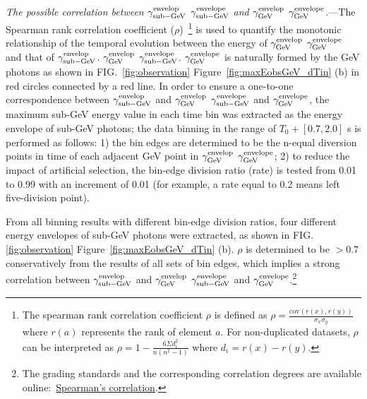 \documentclass[linenumbers,twocolumn]{aastex631}
\providecommand{\DIFaddtex}[1]{{\protect\color{blue} \sf #1}} %
\providecommand{\DIFdeltex}[1]{{\protect\color{red} \scriptsize #1}} %
\providecommand{\DIFaddbegin}{} %
\providecommand{\DIFaddend}{} %
\providecommand{\DIFdelbegin}{} %
\providecommand{\DIFdelend}{} %
\providecommand{\DIFadd}[1]{\texorpdfstring{\DIFaddtex{#1}}{#1}} %
\providecommand{\DIFdel}[1]{\texorpdfstring{\DIFdeltex{#1}}{}} %
\begin{document}
\textit{The possible correlation between  \DIFdelbegin \DIFdel{$\gamma^{\rm envelop}_{\rm sub-GeV}$ }\DIFdelend \DIFaddbegin \DIFadd{$\gamma^{\rm envelope}_{\rm sub-GeV}$ }\DIFaddend and \DIFdelbegin \DIFdel{$\gamma^{\rm envelop}_{\rm GeV}$}\DIFdelend \DIFaddbegin \DIFadd{$\gamma^{\rm envelope}_{\rm GeV}$}\DIFaddend .}\label{sec: correlation}---The Spearman rank correlation coefficient ($\rho$)~\citep{spearman}\footnote{The spearman rank correlation coefficient $\rho$ is defined as $\rho = \frac{\mathrm{cov}(r(x),r(y))}{\sigma_x \sigma_y} $ where $r(a)$ represents the rank of element $a$. For non-duplicated datasets, $\rho$ can be interpreted as $\rho = 1 - \frac{6 \Sigma d^2_i}{n(n^2-1)} $ where $d_i = r(x) - r(y)$.} is used to quantify the monotonic relationship of the temporal evolution between the energy of \DIFdelbegin \DIFdel{$\gamma^{\rm envelop}_{\rm GeV}$ }\DIFdelend \DIFaddbegin \DIFadd{$\gamma^{\rm envelope}_{\rm GeV}$ }\DIFaddend and that of \DIFdelbegin \DIFdel{$\gamma^{\rm envelop}_{\rm sub-GeV}$. $\gamma^{\rm envelop}_{\rm GeV}$ }\DIFdelend \DIFaddbegin \DIFadd{$\gamma^{\rm envelope}_{\rm sub-GeV}$. $\gamma^{\rm envelope}_{\rm GeV}$ }\DIFaddend is naturally formed by the GeV photons as shown in \DIFdelbegin \DIFdel{FIG.~\ref{fig:observation} }\DIFdelend \DIFaddbegin \DIFadd{Figure~\ref{fig:maxEobsGeV_dTin} }\DIFaddend (b) in red circles connected by a red line. In order to ensure a one-to-one correspondence between \DIFdelbegin \DIFdel{$\gamma^{\rm envelop}_{\rm sub-GeV}$ and $\gamma^{\rm envelop}_{\rm GeV}$}\DIFdelend \DIFaddbegin \DIFadd{$\gamma^{\rm envelope}_{\rm sub-GeV}$ and $\gamma^{\rm envelope}_{\rm GeV}$}\DIFaddend , the maximum sub-GeV energy value in each time bin was extracted as the energy envelope of sub-GeV photons; the data binning in the range of $T_0+[0.7, 2.0]$ s is performed as follows: 1) the bin edges are determined to be the n-equal diversion points in time of each adjacent GeV point in \DIFdelbegin \DIFdel{$\gamma^{\rm envelop}_{\rm GeV}$}\DIFdelend \DIFaddbegin \DIFadd{$\gamma^{\rm envelope}_{\rm GeV}$}\DIFaddend ; 2) to reduce the impact of artificial selection, the bin-edge division ratio (rate) is tested from 0.01 to 0.99 with an increment of 0.01 (for example, a rate equal to 0.2 means left five-division point).  

From all binning results with different bin-edge division ratios, four different energy envelopes of sub-GeV photons were extracted, as shown in \DIFdelbegin \DIFdel{FIG.\ref{fig:observation} }\DIFdelend \DIFaddbegin \DIFadd{Figure~\ref{fig:maxEobsGeV_dTin} }\DIFaddend (b). $\rho$ is determined to be $> 0.7$ conservatively from \DIFaddbegin \DIFadd{the }\DIFaddend results of all sets of bin edges, which implies a strong correlation between \DIFdelbegin \DIFdel{$\gamma^{\rm envelop}_{\rm sub-GeV}$ and $\gamma^{\rm envelop}_{\rm GeV}$}\DIFdelend \DIFaddbegin \DIFadd{$\gamma^{\rm envelope}_{\rm sub-GeV}$ and $\gamma^{\rm envelope}_{\rm GeV}$}\DIFaddend .\footnote{The grading standards and the corresponding correlation degrees are available online:~\href{https://www.statstutor.ac.uk/resources/uploaded/spearmans.pdf}{Spearman's correlation}. }
\end{document}
